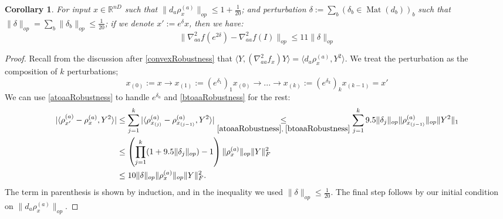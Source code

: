 \documentclass[aos]{imsart}
\newtheorem{corollary}[theorem]{Corollary}
\theoremstyle{definition}
\numberwithin{equation}{section}
\DeclareMathOperator{\mat}{Mat}
\newcommand{\R}{{\mathbb{R}}}
\newcommand{\samp}{x}
\newcommand{\CF}[1]{{\color{purple}[CF: #1]}}
\begin{document}
\begin{appendix}
\begin{corollary} \label{diagRobustness}
For input $\samp \in \R^{nD}$ such that $\|d_{a} \rho_{\samp}^{(a)}\|_{op} \leq 1 + \frac{1}{20}$; and perturbation $\delta := \sum_{b} (\delta_{b} \in \mat(d_{b}))_{b}$ such that $\|\delta\|_{op} = \sum_{b} \|\delta_{b}\|_{op} \leq \frac{1}{20}$; if we denote $\samp' := e^{\delta} \samp$, then we have:
\[ \|\nabla^{2}_{aa} f(e^{2\delta}) - \nabla^{2}_{aa} f(I)\|_{op} \leq 11 \|\delta\|_{op}     \]
\end{corollary}
\begin{proof}
Recall from the discussion after \cref{convexRobustness} that $\langle Y, (\nabla^{2}_{aa} f_{\samp}) Y \rangle = \langle d_{a} \rho_{\samp}^{(a)}, Y^{2} \rangle$. We treat the perturbation as the composition of $k$ perturbations;
\[ \samp_{(0)}:=\samp \to \samp_{(1)}:= (e^{\delta_{1}})_1 \samp_{(0)} \to ... \to \samp_{(k)}:=(e^{\delta_{k}})_{k} \samp_{(k-1)} = \samp'  \]
We can use \cref{atoaaRobustness} to handle $e^{\delta_{a}}$ and \cref{btoaaRobustness} for the rest:
\begin{align*}
 |\langle \rho_{\samp'}^{(a)} - \rho_{\samp}^{(a)}, Y^{2} \rangle|
 &\leq \sum_{j=1}^{k} |\langle \rho_{\samp_{(j)}}^{(a)} - \rho_{\samp_{(j-1)}}^{(a)}, Y^{2} \rangle| \underset{\cref{atoaaRobustness},\;\cref{btoaaRobustness}}{\leq} \sum_{j=1}^{k}  9.5 \|\delta_{j}\|_{op} \|\rho_{\samp_{(j-1)}}^{(a)}\|_{op} \|Y^{2}\|_{1} \\
& \leq \left( \prod_{j=1}^k (1+9.5 \|\delta_{j}\|_{op}) - 1 \right) \|\rho_{\samp}^{(a)}\|_{op} \|Y\|_{F}^{2} \\
&\leq 10 \|\delta\|_{op} \|\rho_{\samp}^{(a)}\|_{op} \|Y\|_{F}^{2}.   \end{align*}
The term in parenthesis is shown by induction, and in the inequality we used $\|\delta\|_{op} \leq \frac{1}{20}$. The final step follows by our initial condition on $\|d_{a} \rho_{\samp}^{(a)}\|_{op}$.
\end{proof}


\end{appendix}
\end{document}
